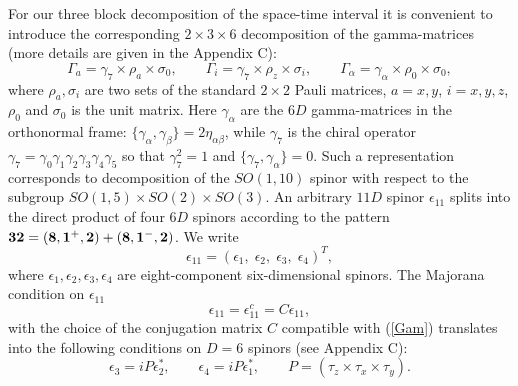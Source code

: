 \documentclass[a4paper,12pt]{article}
\begin{document}
For our three block decomposition of the space-time interval it
is convenient to introduce the corresponding $2\times 3\times 6$
decomposition of the gamma-matrices (more details are given in
the Appendix C):
\begin{equation}
\Gamma_a = \gamma_7 \times \rho_a \times \sigma_0, \qquad
\Gamma_i = \gamma_7 \times \rho_z \times \sigma_i, \qquad
\Gamma_\alpha = \gamma_\alpha \times \rho_0 \times \sigma_0,
\label{Gam}
\end{equation}
where $\rho_a, \sigma_i$ are two sets of the standard $2\times 2$
Pauli matrices, $a=x,y$, $i=x,y,z$, $\rho_0$ and $\sigma_0$ is
the unit matrix. Here $\gamma_\alpha$ are the $6D$ gamma-matrices
in the orthonormal frame: $\{\gamma_\alpha,\gamma_\beta\}=
2\eta_{\alpha\beta}$, while $\gamma_7$ is the chiral operator
$\gamma_7=\gamma_0 \gamma_1 \gamma_2 \gamma_3 \gamma_4 \gamma_5$
so that $\gamma_7^2=1$ and $\{\gamma_7, \gamma_\alpha\} = 0$.
Such a representation corresponds to decomposition of the
$SO(1,10)$ spinor with respect to the subgroup $SO(1,5)\times
SO(2)\times SO(3)$. An arbitrary $11D$ spinor $\epsilon_{11}$
splits into the direct product of four $6D$ spinors according to
the pattern $\bf 32=(8,1^+,2)+(8,1^-,2)$. We write
\begin{equation}\label{SPi}
\epsilon_{11}=(\epsilon_1,\; \epsilon_2,\; \epsilon_3,\;
\epsilon_4)^T,
\end{equation}
where $\epsilon_1,\epsilon_2,\epsilon_3,\epsilon_4$ are
eight-component six-dimensional spinors. The Majorana condition
on $\epsilon_{11}$
\begin{equation}\label{11MA}
\epsilon_{11} = \epsilon_{11}^c = C  \epsilon_{11},
\end{equation}
with the choice of the conjugation matrix $C$ compatible with
(\ref{Gam}) translates into the following conditions on $D=6$
spinors (see Appendix C):
\begin{equation}\label{MAJ}
\epsilon_3 = i P \epsilon_2^*, \qquad \epsilon_4 = i P
\epsilon_1^*, \qquad P=(\tau_z \times \tau_x \times \tau_y).
\end{equation}
\end{document}
